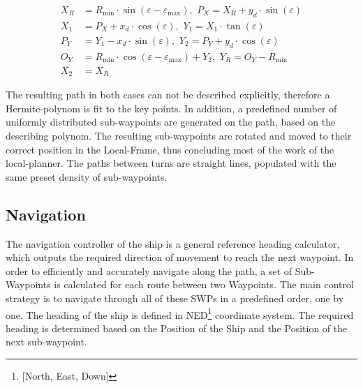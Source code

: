 \documentclass{ifacconf}
\begin{document}
\begin{align}
X_R &= R_\text{min} \cdot \sin(\varepsilon - \varepsilon _\text{max}),\,\, P_X = X_R + y_d \cdot \sin(\varepsilon)\\
X_1 &= P_X + x_d \cdot \cos(\varepsilon),\,\, Y_1 = X_1 \cdot \tan(\varepsilon)\\
P_Y &= Y_1 - x_d \cdot \sin(\varepsilon),\,\, Y_2 = P_Y + y_d \cdot \cos(\varepsilon)\\
O_Y &= R_\text{min} \cdot \cos(\varepsilon - \varepsilon _\text{max}) + Y_2,\,\, Y_R = O_Y - R_\text{min}\\
X_2 &= X_R
\end{align}

The resulting path in both cases can not be described explicitly, therefore a Hermite-polynom is fit to the key points. In addition, a predefined number of uniformly distributed sub-waypoints are generated on the path, based on the describing polynom. The resulting sub-waypoints are rotated and moved to their correct position in the Local-Frame, thus concluding most of the work of the local-planner. The paths between turns are straight lines, populated with the same preset density of sub-waypoints.

\subsection{Navigation}

The navigation controller of the ship is a general reference heading calculator, which outputs the required direction of movement to reach the next waypoint. In order to efficiently and accurately navigate along the path, a set of Sub-Waypoints is calculated for each route between two Waypoints. The main control strategy is to navigate through all of these SWPs in a predefined order, one by one. The heading of the ship is defined in NED\footnote[1]{[North, East, Down]} coordinate system. The required heading is determined based on the Position of the Ship and the Position of the next sub-waypoint.
\end{document}
